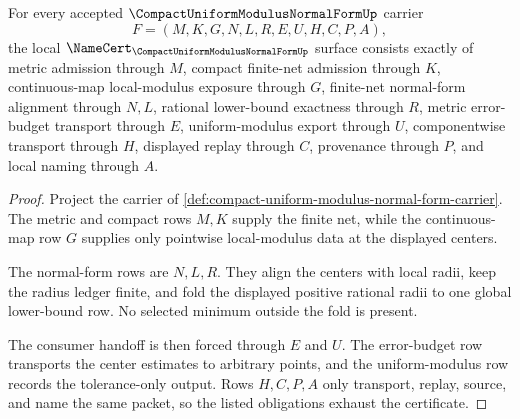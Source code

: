 \begin{theorem}
\label{thm:compact-uniform-modulus-normal-form-namecert-obligations}
For every accepted $\CompactUniformModulusNormalFormUp$ carrier
$$
F=(M,K,G,N,L,R,E,U,H,C,P,A),
$$
the local $\NameCert_{\CompactUniformModulusNormalFormUp}$ surface consists exactly of metric admission through $M$, compact finite-net admission through $K$, continuous-map local-modulus exposure through $G$, finite-net normal-form alignment through $N,L$, rational lower-bound exactness through $R$, metric error-budget transport through $E$, uniform-modulus export through $U$, componentwise transport through $H$, displayed replay through $C$, provenance through $P$, and local naming through $A$.
\end{theorem}
\begin{proof}
Project the carrier of \autoref{def:compact-uniform-modulus-normal-form-carrier}. The metric and compact rows $M,K$ supply the finite net, while the continuous-map row $G$ supplies only pointwise local-modulus data at the displayed centers.

The normal-form rows are $N,L,R$. They align the centers with local radii, keep the radius ledger finite, and fold the displayed positive rational radii to one global lower-bound row. No selected minimum outside the fold is present.

The consumer handoff is then forced through $E$ and $U$. The error-budget row transports the center estimates to arbitrary points, and the uniform-modulus row records the tolerance-only output. Rows $H,C,P,A$ only transport, replay, source, and name the same packet, so the listed obligations exhaust the certificate.
\end{proof}

